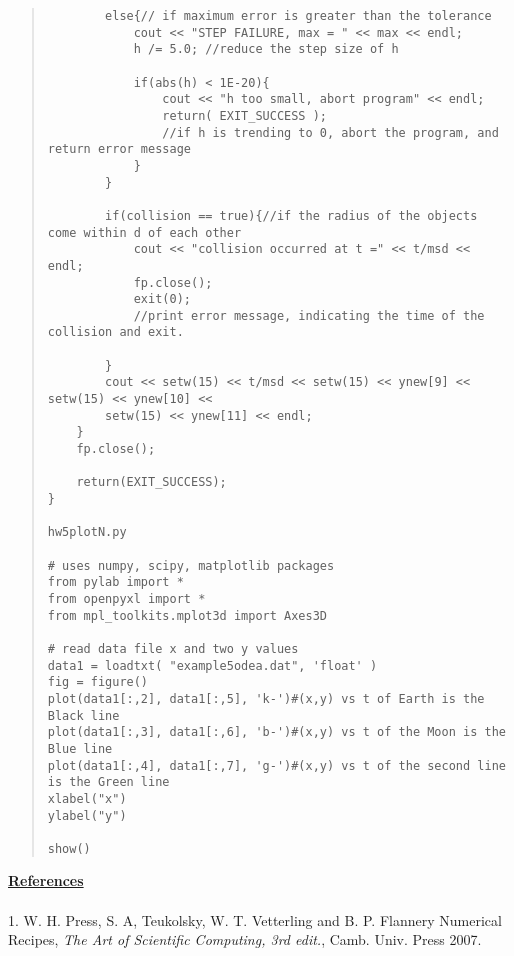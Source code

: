 \documentclass[11pt,letterpaper]{article}
\begin{document}
\begin{quote}
\begin{verbatim}
    	else{// if maximum error is greater than the tolerance
			cout << "STEP FAILURE, max = " << max << endl;
    		h /= 5.0; //reduce the step size of h

    		if(abs(h) < 1E-20){
    			cout << "h too small, abort program" << endl;
    			return( EXIT_SUCCESS );
    			//if h is trending to 0, abort the program, and return error message
			}
		}

		if(collision == true){//if the radius of the objects come within d of each other
			cout << "collision occurred at t =" << t/msd << endl;
			fp.close();
			exit(0);
			//print error message, indicating the time of the collision and exit.

		}
		cout << setw(15) << t/msd << setw(15) << ynew[9] << setw(15) << ynew[10] << 
		setw(15) << ynew[11] << endl;
	}
	fp.close();

	return(EXIT_SUCCESS);
}

hw5plotN.py

# uses numpy, scipy, matplotlib packages
from pylab import *
from openpyxl import *
from mpl_toolkits.mplot3d import Axes3D

# read data file x and two y values
data1 = loadtxt( "example5odea.dat", 'float' )
fig = figure()
plot(data1[:,2], data1[:,5], 'k-')#(x,y) vs t of Earth is the Black line
plot(data1[:,3], data1[:,6], 'b-')#(x,y) vs t of the Moon is the Blue line
plot(data1[:,4], data1[:,7], 'g-')#(x,y) vs t of the second line is the Green line
xlabel("x")
ylabel("y")

show()

\end{verbatim}
\end{quote}


\underline{\bf \large References}
\\
\\
1. W. H. Press, S. A, Teukolsky, W. T. Vetterling and B. P. Flannery Numerical Recipes,
\textit{The Art of Scientific Computing, 3rd edit.}, Camb. Univ. Press 2007.
\\
\\
\end{document}
